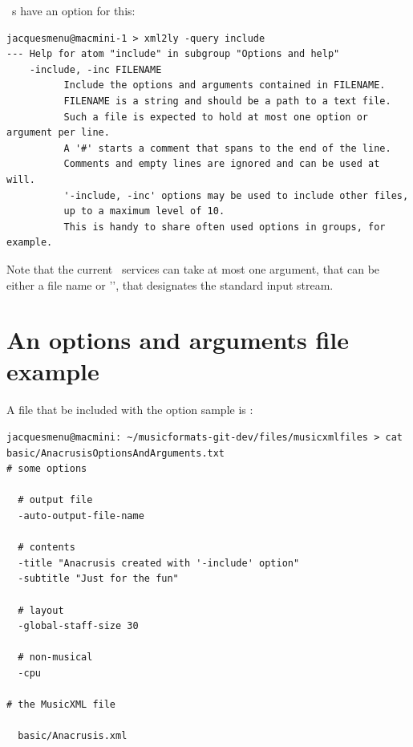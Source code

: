 \mf\ \converter s have an  option for this:
\begin{lstlisting}[language=Terminal]
jacquesmenu@macmini-1 > xml2ly -query include
--- Help for atom "include" in subgroup "Options and help"
    -include, -inc FILENAME
          Include the options and arguments contained in FILENAME.
          FILENAME is a string and should be a path to a text file.
          Such a file is expected to hold at most one option or argument per line.
          A '#' starts a comment that spans to the end of the line.
          Comments and empty lines are ignored and can be used at will.
          '-include, -inc' options may be used to include other files,
          up to a maximum level of 10.
          This is handy to share often used options in groups, for example.
\end{lstlisting}

Note that the current \mf\ services can take at most one argument, that can be either a file name or '\code{-}', that designates the standard input stream.


\section{An options and arguments file example}

A file that be included with the option sample is :
\begin{lstlisting}[language=Terminal]
jacquesmenu@macmini: ~/musicformats-git-dev/files/musicxmlfiles > cat basic/AnacrusisOptionsAndArguments.txt
# some options

  # output file
  -auto-output-file-name

  # contents
  -title "Anacrusis created with '-include' option"
  -subtitle "Just for the fun"

  # layout
  -global-staff-size 30

  # non-musical
  -cpu

# the MusicXML file

  basic/Anacrusis.xml
\end{lstlisting}

